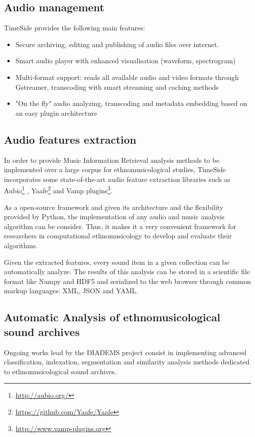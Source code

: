 \documentclass{paper}
\begin{document}
\subsection{Audio management}
TimeSide provides the following main features:
\begin{itemize}
\item Secure archiving, editing and publishing of audio files over
  internet.
\item Smart audio player with enhanced visualisation (waveform, spectrogram)
\item Multi-format support: reads all available audio and video formats  through Gstreamer, transcoding with smart streaming and caching methods%
\item "On the fly" audio analyzing, transcoding and metadata
    embedding based on an easy plugin architecture
\end{itemize}

\subsection{Audio features extraction}
In order to provide Music Information Retrieval analysis methods to be implemented over a large corpus for ethnomusicological studies, TimeSide incorporates some state-of-the-art audio feature extraction libraries such as Aubio\footnote{\url{http://aubio.org/}} \citep{brossierPhD}, Yaafe\footnote{\url{https://github.com/Yaafe/Yaafe}} \citep{yaafe_ISMIR2010} and Vamp plugins\footnote{ \url{http://www.vamp-plugins.org}}.

As a open-source framework and given its architecture and the flexibility provided by Python, the implementation of any audio and music analysis algorithm can be consider. Thus, it makes it a very convenient framework for researchers in computational ethnomusicology to develop and evaluate their algorithms.

Given the extracted features, every sound item in a given collection can be automatically analyze. The results of this analysis can be stored in a scientific file format like Numpy and HDF5 and serialized to the web browser through common markup languages: XML, JSON and YAML.


\subsection{Automatic Analysis of ethnomusicological sound archives}
Ongoing works lead by the DIADEMS project consist in implementing advanced classification, indexation, segmentation and  similarity analysis methods dedicated to ethnomusicological sound archives.
\end{document}

